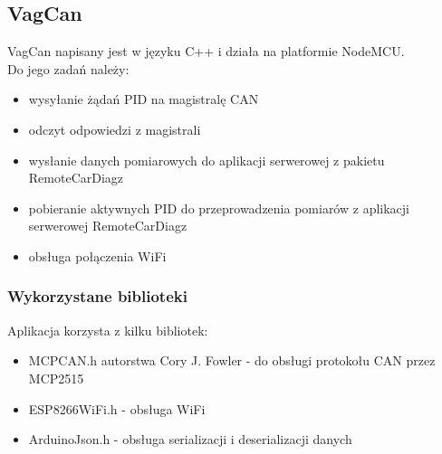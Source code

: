 \documentclass[10pt,a4paper]{scrartcl}
\begin{document}
		\subsection{VagCan}
		VagCan napisany jest w języku C++ i działa na platformie NodeMCU.\\
		Do jego zadań należy:
		\begin{itemize}
			\item wysyłanie żądań PID na magistralę CAN
			\item odczyt odpowiedzi z magistrali
			\item wysłanie danych pomiarowych do aplikacji serwerowej z pakietu RemoteCarDiagz
			\item pobieranie aktywnych PID do przeprowadzenia pomiarów z aplikacji serwerowej RemoteCarDiagz
			\item obsługa połączenia WiFi
		\end{itemize}
		\subsubsection {Wykorzystane biblioteki}
		Aplikacja korzysta z kilku bibliotek:
		\begin{itemize}
			\item MCPCAN.h autorstwa Cory J. Fowler - do obsługi protokołu CAN przez MCP2515
			\item ESP8266WiFi.h - obsługa WiFi
			\item ArduinoJson.h - obsługa serializacji i deserializacji danych
		\end{itemize}
\end{document}
